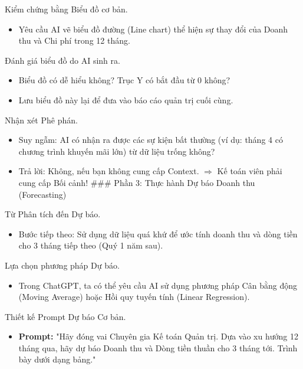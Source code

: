 \documentclass[aspectratio=169]{beamer}
\begin{document}
\begin{frame}{Kiểm chứng bằng Biểu đồ cơ bản.}
    \begin{itemize}
        \item Yêu cầu AI vẽ biểu đồ đường (Line chart) thể hiện sự thay đổi của Doanh thu và Chi phí trong 12 tháng.
    \end{itemize}
\end{frame}


\begin{frame}{Đánh giá biểu đồ do AI sinh ra.}
    \begin{itemize}
        \item Biểu đồ có dễ hiểu không? Trục Y có bắt đầu từ 0 không?
        \item Lưu biểu đồ này lại để đưa vào báo cáo quản trị cuối cùng.
    \end{itemize}
\end{frame}


\begin{frame}{Nhận xét Phê phán.}
    \begin{itemize}
        \item Suy ngẫm: AI có nhận ra được các sự kiện bất thường (ví dụ: tháng 4 có chương trình khuyến mãi lớn) từ dữ liệu trống không?
        \item Trả lời: Không, nếu bạn không cung cấp Context. $\Rightarrow$ Kế toán viên phải cung cấp Bối cảnh!
        ### Phần 3: Thực hành Dự báo Doanh thu (Forecasting)
    \end{itemize}
\end{frame}


\begin{frame}{Từ Phân tích đến Dự báo.}
    \begin{itemize}
        \item Bước tiếp theo: Sử dụng dữ liệu quá khứ để ước tính doanh thu và dòng tiền cho 3 tháng tiếp theo (Quý 1 năm sau).
    \end{itemize}
\end{frame}


\begin{frame}{Lựa chọn phương pháp Dự báo.}
    \begin{itemize}
        \item Trong ChatGPT, ta có thể yêu cầu AI sử dụng phương pháp Cân bằng động (Moving Average) hoặc Hồi quy tuyến tính (Linear Regression).
    \end{itemize}
\end{frame}


\begin{frame}{Thiết kế Prompt Dự báo Cơ bản.}
    \begin{itemize}
        \item \textbf{Prompt:} "Hãy đóng vai Chuyên gia Kế toán Quản trị. Dựa vào xu hướng 12 tháng qua, hãy dự báo Doanh thu và Dòng tiền thuần cho 3 tháng tới. Trình bày dưới dạng bảng."
    \end{itemize}
\end{frame}
\end{document}
